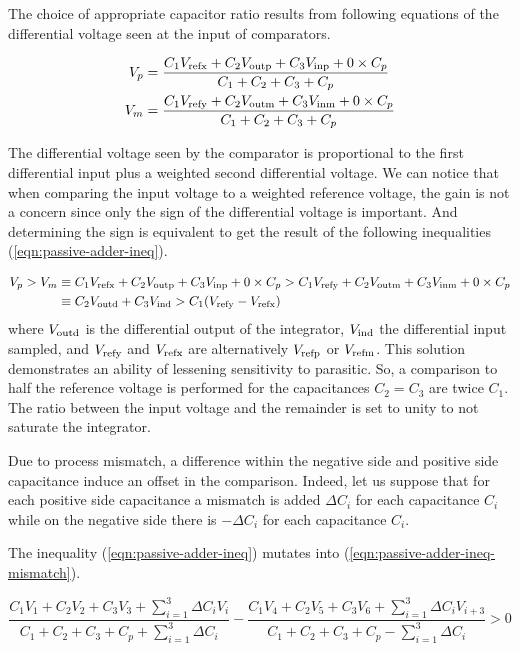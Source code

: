 The choice of appropriate capacitor ratio results from following equations of the differential voltage seen at the input of comparators.

\begin{align}
	V_p &= \frac{C_1V_{\rm refx}+C_2V_{\rm outp}+C_3V_{\rm inp}+0\times C_p}{C_1+C_2+C_3+C_p} \\
	V_m &= \frac{C_1V_{\rm refy}+C_2V_{\rm outm}+C_3V_{\rm inm}+0\times C_p}{C_1+C_2+C_3+C_p}
\end{align}

The differential voltage seen by the comparator is proportional to the first differential input plus a weighted second differential voltage. We can notice that when comparing the input voltage to a weighted reference voltage, the gain is not a concern since only the sign of the differential voltage is important. And determining the sign is equivalent to get the result of the following inequalities (\ref{eqn:passive-adder-ineq}).

\begin{align}
	\label{eqn:passive-adder-ineq}
	V_p > V_m &\equiv C_1V_{\rm refx}+C_2V_{\rm outp}+C_3V_{\rm inp}+0\times C_p > C_1V_{\rm refy}+C_2V_{\rm outm}+C_3V_{\rm inm}+0\times C_p \\
	&\equiv C_2V_{\rm outd}+C_3V_{\rm ind} > C_1(V_{\rm refy}-V_{\rm refx})
\end{align}
where  \(V_{\rm outd}\) is the differential output of the integrator, \(V_{\rm ind}\) the differential input sampled, and \(V_{\rm refy}\) and \(V_{\rm refx}\) are alternatively \(V_{\rm refp}\) or \(V_{\rm refm}\). This solution demonstrates an ability of lessening sensitivity to parasitic. So, a comparison to half the reference voltage is performed for the capacitances \(C_2 = C_3\) are twice \(C_1\). The ratio between the input voltage and the remainder is set to unity to not saturate the integrator.

Due to process mismatch, a difference within the negative side and positive side capacitance induce an offset in the comparison. Indeed, let us suppose that for each positive side capacitance a mismatch is added \(\Delta C_i\) for each capacitance \(C_i\) while on the negative side there is \(-\Delta C_i\) for each capacitance \(C_i\). 

The inequality (\ref{eqn:passive-adder-ineq}) mutates into (\ref{eqn:passive-adder-ineq-mismatch}).

\begin{equation}
	\label{eqn:passive-adder-ineq-mismatch}
	\frac{C_1V_{1}+C_2V_{2}+C_3V_{3}+\sum_{i=1}^{3}{\Delta C_i V_i}}{C_1+C_2+C_3+C_p+\sum_{i=1}^{3}{\Delta C_i}} - \frac{C_1V_{4}+C_2V_{5}+C_3V_{6}+\sum_{i=1}^{3}{\Delta C_i V_{i+3}}}{C_1+C_2+C_3+C_p-\sum_{i=1}^{3}{\Delta C_i}} > 0
\end{equation}

